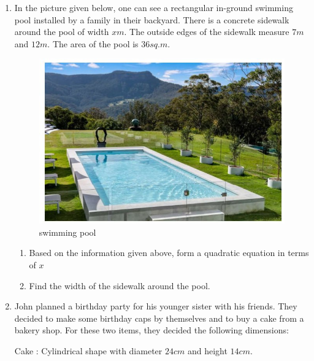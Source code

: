 \documentclass{article}
\begin{document}
\begin{enumerate}
\item In the picture given below, one can see a rectangular in-ground swimming pool installed by a family in their backyard. There is a concrete sidewalk around the pool of width $x m$. The outside edges of the sidewalk measure $7 m$ and $12 m$. The area of the pool is $36 sq. m$.
\begin{figure}[H]
    \centering
    \includegraphics[width=\columnwidth]{figs/swimming pool.png}
    \caption{swimming pool}
    \label{fig:swimming pool}
\end{figure}
\begin{enumerate}
    \item Based on the information given above, form a quadratic equation in terms of $x$
    \item Find the width of the sidewalk around the pool.
\end{enumerate}

\item John planned a birthday party for his younger sister with his friends. They decided to make some birthday caps by themselves and to buy a cake from a bakery shop. For these two items, they decided the following dimensions:

Cake : Cylindrical shape with diameter $24 cm$ and height $14 cm.$


\end{enumerate}
\end{document}
